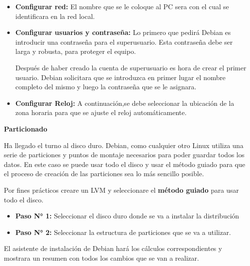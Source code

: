 				\begin{itemize}
					
					\item \textbf{Configurar red:} El nombre que se le coloque al PC sera con el cual se identificara en la red local.
					
					\item \textbf{Configurar usuarios y contraseña:} Lo primero que pedirá Debian es introducir una contraseña para el superusuario. Esta contraseña debe ser larga y robusta, para proteger el equipo.
					
					Después de haber creado la cuenta de superusuario es hora de crear el primer usuario. Debian solicitara que se introduzca en primer lugar el nombre completo del mismo y luego la contraseña que se le asignara.
					
					\item \textbf{Configurar Reloj:} A continuación,se debe seleccionar la ubicación de la zona horaria para que se ajuste el reloj automáticamente.
					
				\end{itemize}

				\vspace{0.3cm}
				
				\textbf{Particionado}\vspace{0.2cm}
				
				Ha llegado el turno al disco duro. Debian, como cualquier otro Linux utiliza una serie de particiones y puntos de montaje necesarios para poder guardar todos los datos. En este caso se puede usar todo el disco y usar el método guiado para que el proceso de creación de las particiones sea lo más sencillo posible.
				
				Por fines prácticos creare un LVM y seleccionare el \textbf{método guiado} para usar todo el disco.
				
				\begin{itemize}
					
					\item \textbf{Paso N° 1:} Seleccionar el disco duro donde se va a instalar la distribución
					
					\item \textbf{Paso N° 2:} Seleccionar la estructura de particiones que se va a utilizar.
					
				\end{itemize}

								
				El asistente de instalación de Debian hará los cálculos correspondientes y mostrara un resumen con todos los cambios que se van a realizar.\par			
				
